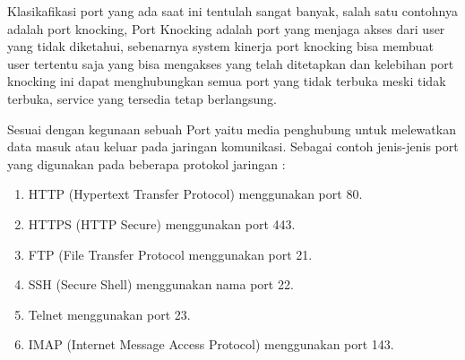 \documentclass[12pt,a4paper]{article}
\begin{document}
\hspace{1cm}
Klasikafikasi port yang ada saat ini tentulah sangat banyak, salah satu contohnya adalah port knocking, Port Knocking adalah port yang menjaga akses  dari user yang tidak diketahui, sebenarnya system kinerja port knocking bisa membuat user tertentu saja yang bisa mengakses yang telah ditetapkan dan kelebihan port knocking ini dapat menghubungkan semua port yang tidak terbuka meski tidak terbuka, service yang tersedia tetap berlangsung.

\hspace{1cm}
Sesuai dengan kegunaan sebuah Port yaitu media penghubung untuk melewatkan data masuk atau keluar pada jaringan komunikasi. Sebagai contoh jenis-jenis port yang digunakan pada beberapa protokol jaringan :\\
\begin{enumerate}
\item HTTP (Hypertext Transfer Protocol) menggunakan port 80.
\item HTTPS (HTTP Secure) menggunakan port 443.
\item FTP (File Transfer Protocol menggunakan port 21.
\item SSH (Secure Shell) menggunakan nama port 22.
\item Telnet menggunakan port 23.
\item IMAP (Internet Message Access Protocol) menggunakan port 143.
\end{enumerate}
\end{document}
